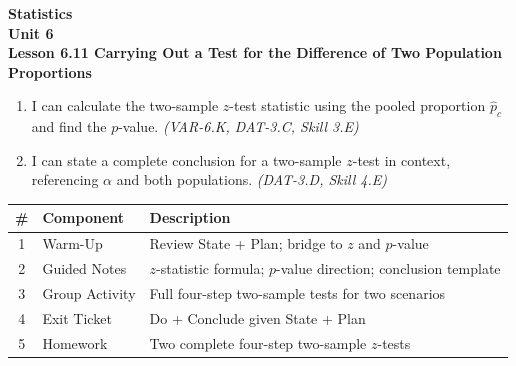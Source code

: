 \documentclass[10pt]{article}
\begin{document}
\vspace{-0.8in}

\begin{center}
  {\color{white}\textbf{\LARGE Statistics}}\\[4pt]
  {\color{skymid}\large\textbf{Unit 6}}\\[6pt]
  {\color{white}\textbf{\large Lesson 6.11 \quad Carrying Out a Test for the Difference of Two Population Proportions}}
\end{center}

\vspace{0.22in}
\namedateperiod
\vspace{0.18in}

\begin{learningtargetbox}
\small
\begin{enumerate}[leftmargin=1.5em, itemsep=5pt]
  \item I can calculate the two-sample $z$-test statistic using the pooled proportion $\hat p_c$ and find the $p$-value. \textit{(VAR-6.K, DAT-3.C, Skill 3.E)}
  \item I can state a complete conclusion for a two-sample $z$-test in context, referencing $\alpha$ and both populations. \textit{(DAT-3.D, Skill 4.E)}
\end{enumerate}
\end{learningtargetbox}

\vspace{0.14in}

\begin{tocbox}
\small
\renewcommand{\arraystretch}{1.5}
\begin{tabularx}{\linewidth}{@{} c l X @{}}
\rowcolor{sky}
\textbf{\#} & \textbf{Component} & \textbf{Description} \\
\midrule
1 & Warm-Up        & Review State + Plan; bridge to $z$ and $p$-value \\
2 & Guided Notes   & $z$-statistic formula; $p$-value direction; conclusion template \\
3 & Group Activity & Full four-step two-sample tests for two scenarios \\
4 & Exit Ticket    & Do + Conclude given State + Plan \\
5 & Homework       & Two complete four-step two-sample $z$-tests \\
\end{tabularx}
\end{tocbox}
\end{document}
